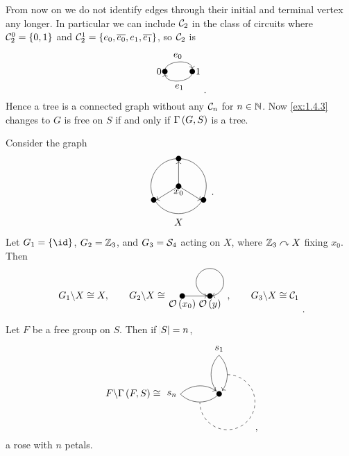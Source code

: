 
\begin{remark}
From now on we do not identify edges through their initial and terminal vertex any longer. In particular we can include $ \mathcal{C}_2 $ in the class of circuits where $ \CCC_2^0 = \cbr{0, 1} $ and $ \CCC_2^1 = \cbr{e_0, \overline{e_0}, e_1, \overline{e_1}} $, so $ \mathcal{C}_2 $ is
$$
\begin{tikzpicture}
\fill (0, 0) circle (0.1) node[left]{$ 0 $};
\fill (1, 0) circle (0.1) node[right]{$ 1 $};
\draw [->] (0, 0) to [bend left=90] node[above]{$ e_0 $} (1, 0.1);
\draw [->] (1, 0) to [bend left=90] node[below]{$ e_1 $} (0, -0.1);
\end{tikzpicture}.
$$
Hence a tree is a connected graph without any $ \mathcal{C}_n $ for $ n \in \mathbb{N} $. Now \ref{ex:1.4.3} changes to $ G $ is free on $ S $ if and only if $ \Gamma\br{G, S} $ is a tree.
\end{remark}

\pagebreak

\begin{example}
Consider the graph
$$
\begin{array}{c}
\begin{tikzpicture}
\fill (0, 0) circle (0.1) node[below]{$ x_0 $};
\fill (0, 1) circle (0.1);
\fill (-0.9, -0.5) circle (0.1);
\fill (0.9, -0.5) circle (0.1);
\draw [->] (0, 0) to (0, 0.9);
\draw [->] (0, 0) to (-0.8, -0.5);
\draw [->] (0, 0) to (0.8, -0.5);
\draw (0, 0) circle (1);
\end{tikzpicture}
\\
X
\end{array}.
$$
Let $ G_1 = \cbr{\id} $, $ G_2 = \mathbb{Z}_3 $, and $ G_3 = \mathcal{S}_4 $ acting on $ X $, where $ \mathbb{Z}_3 \curvearrowright X $ fixing $ x_0 $. Then
$$
\begin{tikzpicture}
\draw (-0.5, 0) node[left]{$ G_1 \backslash X \cong X, \qquad G_2 \backslash X \cong $};
\fill (0, 0) circle (0.1) node[below]{$ \OOO\br{x_0} $};
\fill (1, 0) circle (0.1) node[below]{$ \OOO\br{y} $};
\draw [->] (0, 0) to (0.9, 0);
\draw [->] (1, 0) arc (270:-80:0.5);
\draw (1.5, 0) node[right]{$, \qquad G_3 \backslash X \cong \CCC_1 $};
\end{tikzpicture}.
$$
\end{example}

\begin{example}
Let $ F $ be a free group on $ S $. Then if $ \abs{S} = n $,
$$
\begin{tikzpicture}
\draw (-2, 0) node[left]{$ F \backslash \Gamma\br{F, S} \cong $};
\fill (0, 0) circle (0.1);
\draw (0, 0) arc (225:135:1) node[above]{$ s_1 $};
\draw [->] (0, 1.4) arc (45:-35:1);
\draw [dashed] (0.3, 0.7) arc (90:-180:1);
\draw (0, 0) arc (-45:-135:1) node[left]{$ s_n $};
\draw [->] (-1.4, 0) arc (135:55:1);
\end{tikzpicture},
$$
a rose with $ n $ petals.
\end{example}

